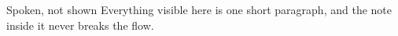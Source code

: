 \documentclass[aspectratio=169]{slides}
\begin{document}
\begin{frame}{Spoken, not shown}
Everything visible here is one short paragraph, and the note inside
it  never breaks the flow.

\end{frame}
\end{document}
